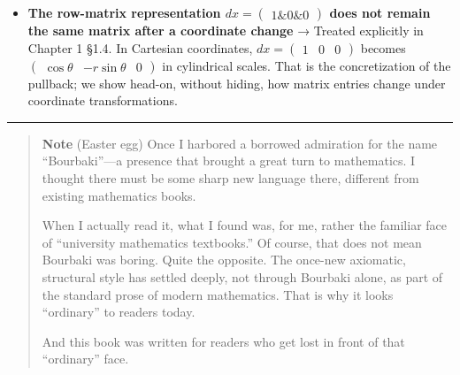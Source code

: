 \begin{itemize}
  \textbf{In the differential-form presentation of Maxwell's equations, aren't unit normalization, sign conventions, and metric signature ambiguous?}
  → Chapter 10 §10.1 explicitly normalizes dimensions with \(w=ct\) and
  \(\mathbf{B}'=c\mathbf{B}\), §10.3 defines the Minkowski metric
  signature, the note in §10.2 fixes the sign convention for
  \(F_{\mu\nu}\), and §10.6 declares the convention \(F=-d\mathcal{A}\).
  The note in §10.5 also remarks that normalization of \(\mathcal{J}\)
  may differ in coefficient from standard relativistic notation.
\item
  \textbf{The row-matrix representation $dx = \begin{pmatrix}1\&0\&0\end{pmatrix}$ does not remain the same matrix after a coordinate change}
  → Treated explicitly in Chapter 1 §1.4. In Cartesian coordinates,
  \(dx = \begin{pmatrix}1&0&0\end{pmatrix}\) becomes
  \(\begin{pmatrix}\cos\theta & -r\sin\theta & 0\end{pmatrix}\) in
  cylindrical scales. That is the concretization of the pullback; we
  show head-on, without hiding, how matrix entries change under
  coordinate transformations.
\end{itemize}

\begin{center}\rule{0.5\linewidth}{0.5pt}\end{center}

\begin{quote}
\textbf{Note} (Easter egg) Once I harbored a borrowed admiration for the
name ``Bourbaki''---a presence that brought a great turn to mathematics.
I thought there must be some sharp new language there, different from
existing mathematics books.

When I actually read it, what I found was, for me, rather the familiar
face of ``university mathematics textbooks.'' Of course, that does not
mean Bourbaki was boring. Quite the opposite. The once-new axiomatic,
structural style has settled deeply, not through Bourbaki alone, as part
of the standard prose of modern mathematics. That is why it looks
``ordinary'' to readers today.

And this book was written for readers who get lost in front of that
``ordinary'' face.
\end{quote}

